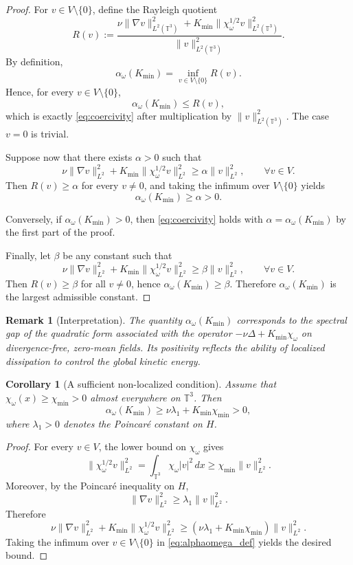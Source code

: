 \documentclass[preprint,12pt]{elsarticle}
\newtheorem{remark}[theorem]{Remark}
\newtheorem{corollary}[theorem]{Corollary}
\begin{document}
\begin{proof}
For $v\in V\setminus\{0\}$, define the Rayleigh quotient
\[
R(v):=
\frac{
\nu \|\nabla v\|_{L^2(\mathbb{T}^3)}^2
+
K_{\min}\|\chi_\omega^{1/2} v\|_{L^2(\mathbb{T}^3)}^2
}{
\|v\|_{L^2(\mathbb{T}^3)}^2
}.
\]
By definition,
\[
\alpha_\omega(K_{\min})=\inf_{v\in V\setminus\{0\}} R(v).
\]
Hence, for every $v\in V\setminus\{0\}$,
\[
\alpha_\omega(K_{\min})\le R(v),
\]
which is exactly \eqref{eq:coercivity} after multiplication by
$\|v\|_{L^2(\mathbb{T}^3)}^2$.
The case $v=0$ is trivial.

Suppose now that there exists $\alpha>0$ such that
\[
\nu \|\nabla v\|_{L^2}^2
+
K_{\min}\|\chi_\omega^{1/2} v\|_{L^2}^2
\ge
\alpha \|v\|_{L^2}^2,
\qquad \forall v\in V.
\]
Then $R(v)\ge \alpha$ for every $v\neq0$, and taking the infimum over
$V\setminus\{0\}$ yields
\[
\alpha_\omega(K_{\min})\ge \alpha>0.
\]

Conversely, if $\alpha_\omega(K_{\min})>0$, then \eqref{eq:coercivity} holds
with $\alpha=\alpha_\omega(K_{\min})$ by the first part of the proof.

Finally, let $\beta$ be any constant such that
\[
\nu \|\nabla v\|_{L^2}^2
+
K_{\min}\|\chi_\omega^{1/2} v\|_{L^2}^2
\ge
\beta \|v\|_{L^2}^2,
\qquad \forall v\in V.
\]
Then $R(v)\ge \beta$ for all $v\neq0$, hence
$\alpha_\omega(K_{\min})\ge \beta$.
Therefore $\alpha_\omega(K_{\min})$ is the largest admissible constant.
\end{proof}

\begin{remark}[Interpretation]
The quantity $\alpha_\omega(K_{\min})$ corresponds to the spectral gap of the
quadratic form associated with the operator
$-\nu\Delta + K_{\min}\chi_\omega$ on divergence-free, zero-mean fields.
Its positivity reflects the ability of localized dissipation to control the
global kinetic energy.
\end{remark}

\begin{corollary}[A sufficient non-localized condition]
\label{cor:coercivity_sufficient}
Assume that $\chi_\omega(x)\ge \chi_{\min}>0$ almost everywhere on
$\mathbb{T}^3$.
Then
\[
\alpha_\omega(K_{\min})\ge \nu\lambda_1 + K_{\min}\chi_{\min}>0,
\]
where $\lambda_1>0$ denotes the Poincar\'e constant on $H$.
\end{corollary}

\begin{proof}
For every $v\in V$, the lower bound on $\chi_\omega$ gives
\[
\|\chi_\omega^{1/2}v\|_{L^2}^2
=
\int_{\mathbb{T}^3}\chi_\omega |v|^2\,dx
\ge
\chi_{\min}\|v\|_{L^2}^2.
\]
Moreover, by the Poincar\'e inequality on $H$,
\[
\|\nabla v\|_{L^2}^2\ge \lambda_1\|v\|_{L^2}^2.
\]
Therefore
\[
\nu \|\nabla v\|_{L^2}^2
+
K_{\min}\|\chi_\omega^{1/2} v\|_{L^2}^2
\ge
(\nu\lambda_1+K_{\min}\chi_{\min})\|v\|_{L^2}^2.
\]
Taking the infimum over $v\in V\setminus\{0\}$ in
\eqref{eq:alphaomega_def} yields the desired bound.
\end{proof}
\end{document}
